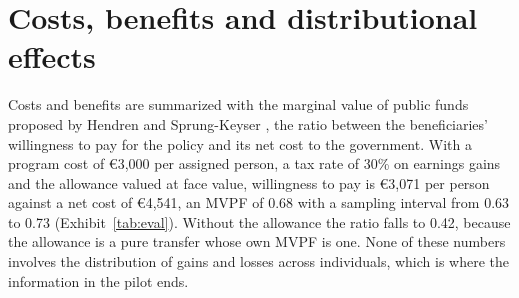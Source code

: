 \documentclass[11pt,a4paper]{article}
\begin{document}
\section{Costs, benefits and distributional effects}
Costs and benefits are summarized with the marginal value of public funds proposed by Hendren and Sprung-Keyser \cite{hendren}, the ratio between the beneficiaries' willingness to pay for the policy and its net cost to the government. With a program cost of €3,000 per assigned person, a tax rate of 30\% on earnings gains and the allowance valued at face value, willingness to pay is €3,071 per person against a net cost of €4,541, an MVPF of 0.68 with a sampling interval from 0.63 to 0.73 (Exhibit~\ref{tab:eval}). Without the allowance the ratio falls to 0.42, because the allowance is a pure transfer whose own MVPF is one. None of these numbers involves the distribution of gains and losses across individuals, which is where the information in the pilot ends.
\end{document}
